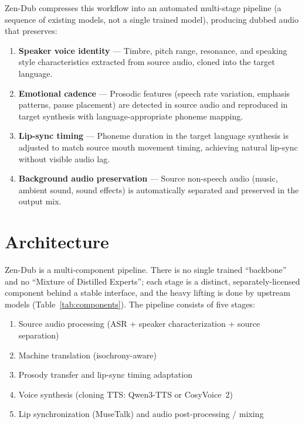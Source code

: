 \documentclass[11pt,a4paper]{article}
\begin{document}
Zen-Dub compresses this workflow into an automated multi-stage pipeline (a sequence of
existing models, not a single trained model), producing dubbed audio that preserves:

\begin{enumerate}
\item \textbf{Speaker voice identity} --- Timbre, pitch range, resonance, and speaking
      style characteristics extracted from source audio, cloned into the target language.
\item \textbf{Emotional cadence} --- Prosodic features (speech rate variation, emphasis
      patterns, pause placement) are detected in source audio and reproduced in target
      synthesis with language-appropriate phoneme mapping.
\item \textbf{Lip-sync timing} --- Phoneme duration in the target language synthesis
      is adjusted to match source mouth movement timing, achieving natural lip-sync
      without visible audio lag.
\item \textbf{Background audio preservation} --- Source non-speech audio (music,
      ambient sound, sound effects) is automatically separated and preserved in the
      output mix.
\end{enumerate}

\section{Architecture}
\label{sec:arch}

Zen-Dub is a multi-component pipeline. There is no single trained ``backbone'' and no
``Mixture of Distilled Experts''; each stage is a distinct, separately-licensed
component behind a stable interface, and the heavy lifting is done by upstream models
(Table~\ref{tab:components}). The pipeline consists of five stages:

\begin{enumerate}
\item Source audio processing (ASR + speaker characterization + source separation)
\item Machine translation (isochrony-aware)
\item Prosody transfer and lip-sync timing adaptation
\item Voice synthesis (cloning TTS: Qwen3-TTS or CosyVoice~2)
\item Lip synchronization (MuseTalk) and audio post-processing / mixing
\end{enumerate}
\end{document}
